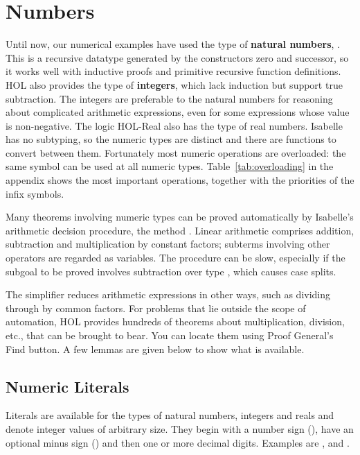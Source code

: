
\section{Numbers}
\label{sec:numbers}

Until now, our numerical examples have used the type of \textbf{natural
numbers},
.  This is a recursive datatype generated by the constructors
zero  and successor, so it works well with inductive proofs and primitive
recursive function definitions.  HOL also provides the type
 of \textbf{integers}, which lack induction but support true
subtraction.  The integers are preferable to the natural numbers for reasoning about
complicated arithmetic expressions, even for some expressions whose
value is non-negative.  The logic HOL-Real also has the type
 of real numbers.  Isabelle has no subtyping,  so the numeric
types are distinct and there are  functions to convert between them.
Fortunately most numeric operations are overloaded: the same symbol can be
used at all numeric types. Table~\ref{tab:overloading} in the appendix
shows the most important operations, together with the priorities of the
infix symbols.


Many theorems involving numeric types can be proved automatically by
Isabelle's arithmetic decision procedure, the method
.  Linear arithmetic comprises addition, subtraction
and multiplication by constant factors; subterms involving other operators
are regarded as variables.  The procedure can be slow, especially if the
subgoal to be proved involves subtraction over type , which 
causes case splits.  

The simplifier reduces arithmetic expressions in other
ways, such as dividing through by common factors.  For problems that lie
outside the scope of automation, HOL provides hundreds of
theorems about multiplication, division, etc., that can be brought to
bear.  You can locate them using Proof General's Find
button.  A few lemmas are given below to show what
is available.

\subsection{Numeric Literals}
\label{sec:numerals}

Literals are available for the types of natural numbers, integers 
and reals and denote integer values of arbitrary size. 
They begin 
with a number sign (\isa{\#}), have an optional minus sign (\isa{-}) and 
then one or more decimal digits. Examples are ,  
and .

